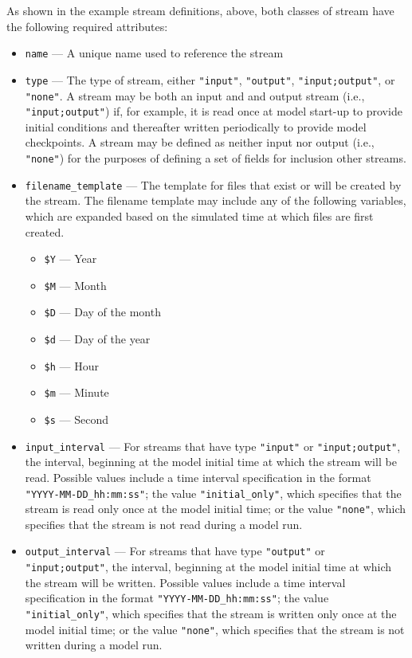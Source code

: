 As shown in the example stream definitions, above, both classes of stream have the following required attributes:

\begin{itemize}
\item {\tt name} --- A unique name used to reference the stream
\item {\tt type} --- The type of stream, either {\tt "input"}, {\tt "output"}, {\tt "input;output"}, or {\tt "none"}. A stream may be both an input
and and output stream (i.e., {\tt "input;output"}) if, for example, it is read once at model start-up to provide initial conditions and thereafter written 
periodically to provide model checkpoints. A stream may be defined as neither input nor output (i.e., {\tt "none"}) for the purposes of defining a 
set of fields for inclusion other streams.
\item {\tt filename\_template} --- The template for files that exist or will be created by the stream. The filename template may include any of the
following variables, which are expanded based on the simulated time at which files are first created.
\begin{itemize}
\item {\tt \$Y} --- Year
\item {\tt \$M} --- Month
\item {\tt \$D} --- Day of the month
\item {\tt \$d} --- Day of the year
\item {\tt \$h} --- Hour
\item {\tt \$m} --- Minute
\item {\tt \$s} --- Second
\end{itemize}
\item {\tt input\_interval} --- For streams that have type {\tt "input"} or {\tt "input;output"}, the interval, beginning at the model initial time
at which the stream will be read. Possible values include a time interval specification in the format {\tt "YYYY-MM-DD\_hh:mm:ss"}; the value 
{\tt "initial\_only"}, which specifies that the stream is read only once at the model initial time; or the value {\tt "none"}, which specifies that 
the stream is not read during a model run.
\item {\tt output\_interval} --- For streams that have type {\tt "output"} or {\tt "input;output"}, the interval, beginning at the model initial time
at which the stream will be written. Possible values include a time interval specification in the format {\tt "YYYY-MM-DD\_hh:mm:ss"}; the value 
{\tt "initial\_only"}, which specifies that the stream is written only once at the model initial time; or the value {\tt "none"}, which specifies that 
the stream is not written during a model run.
\end{itemize}

